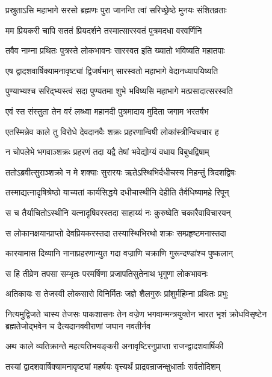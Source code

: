 \twolineshloka
{प्रस्रुताऽसि महाभागे सरसो ब्रह्मणः पुरा}
{जानन्ति त्वां सरिच्छ्रेष्ठे मुनयः संशितव्रताः}


\twolineshloka
{मम प्रियकरी चापि सततं प्रियदर्शने}
{तस्मात्सारस्वतं पुत्रमदधा वरवर्णिनि}


\twolineshloka
{तवैव नाम्ना प्रथितः पुत्रस्ते लोकभावनः}
{सारस्वत इति ख्यातो भविष्यति महातपाः}


\twolineshloka
{एष द्वादशवार्षिक्यामनावृष्ट्यां द्विजर्षभान्}
{सारस्वतो महाभागे वेदानध्यापयिष्यति}


\twolineshloka
{पुण्याभ्यश्च सरिद्भ्यस्त्वं सदा पुण्यतमा शुभे}
{भविष्यसि महाभागे मत्प्रसादात्सरस्वति}


\twolineshloka
{एवं स्त संस्तुता तेन वरं लब्ध्वा महानदी}
{पुत्रमादाय मुदिता जगाम भरतर्षभ}


\twolineshloka
{एतस्मिन्नेव काले तु विरोधे देवदानवैः}
{शक्रः प्रहरणान्विषी लोकांस्त्रीन्विचचार ह}


\twolineshloka
{न चोपलेभे भगवाञ्शक्रः प्रहरणं तदा}
{यद्वै तेषां भवेद्योग्यं वधाय विबुधद्विषाम्}


\twolineshloka
{ततोऽब्रवीत्सुराञ्शक्रो न मे शक्याः सुरारयः}
{ऋतेऽस्थिभिर्दधीचस्य निहन्तुं त्रिदशद्विषः}


\twolineshloka
{तस्माद्यत्नादृषिश्रेष्ठो याच्यतां कार्यसिद्धये}
{दधीचास्थीनि देहीति तैर्वधिष्यामहे रिपून्}


\twolineshloka
{स च तैर्याचितोऽस्थीनि यत्नादृषिवरस्तदा}
{साहाय्यं नः कुरुष्वेति चकारैवाविचारयन्}


\twolineshloka
{स लोकानक्षयान्प्राप्तो देवप्रियकरस्तदा}
{तस्यास्थिभिरथो शक्रः सम्प्रहृष्टमनास्तदा}


\twolineshloka
{कारयामास दिव्यानि नानाप्रहरणान्युत}
{गदा वज्राणि चक्राणि गुरून्दण्डांश्च पुष्कलान्}


\twolineshloka
{स हि तीव्रेण तपसा सम्भृतः परमर्षिणा}
{प्रजापतिसुतेनाथ भृगुणा लोकभावनः}


\twolineshloka
{अतिकायः स तेजस्वी लोकसारो विनिर्मितः}
{जज्ञे शैलगुरुः प्रांशुर्महिम्ना प्रथितः प्रभुः}


नित्यमुद्विजते चास्य तेजसः पाकशासनः
\threelineshloka
{तेन वज्रेण भगवान्मन्त्रयुक्तेन भारत}
{भृशं क्रोधविसृष्टेन ब्रह्मतेजोद्भवेन च}
{दैत्यदानववीराणां जघान नवतीर्नव}


\twolineshloka
{अथ काले व्यतिक्रान्ते महत्यतिभयङ्करी}
{अनावृष्टिरनुप्राप्ता राजन्द्वादशवार्षिकी}


\twolineshloka
{तस्यां द्वादशवार्षिक्यामनावृष्ट्यां महर्षयः}
{वृत्त्यर्थं प्राद्रवन्राजन्क्षुधार्ताः सर्वतोदिशम्}


